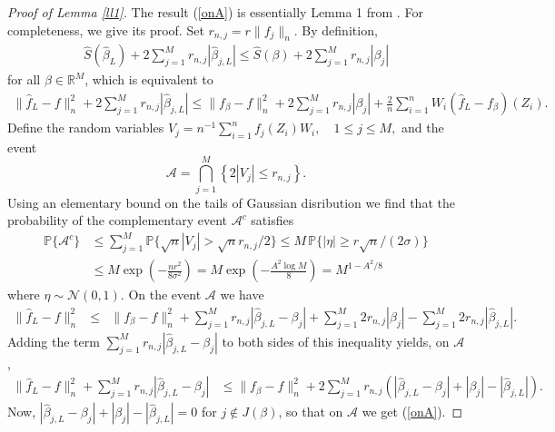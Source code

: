 \documentclass[dvips,aos]{imsart}
\numberwithin{equation}{section}
\theoremstyle{plain}
\def\sf{}
\def\wideth{\widehat}
\def\wh{\widehat}
\def\A{\mbox{$\mathcal A$}}
\def\RR{\mathbb R}
\def\PP{\mathbb{P}}
\begin{document}
\begin{proof}[Proof of Lemma \ref{ll1}] The result (\ref{onA}) is essentially Lemma 1
from \cite{btw06b}. For completeness, we give its proof. Set $
r_{n,j} = r \|f_j\|_n $. By definition,
\begin{eqnarray*}
\wh{S}(\widehat\beta_L) +  2\sum_{j=1}^M r_{n,j} |\widehat
\beta_{j,L}| \le \wh{S}(\beta) + 2\sum_{j=1}^M r_{n,j} |\beta_j|
\end{eqnarray*} for all $\beta\in\RR^M$,
which is equivalent to
\begin{eqnarray*}
\| \wideth{f}_L - f\|_n^2 +  2\sum_{j=1}^M r_{n,j} |\widehat
\beta_{j,L}| \le \| {\sf f}_{\beta} - f\|_n^2 +  2\sum_{j=1}^M
r_{n,j} |\beta_j| +\frac{2}{n}\sum_{i=1}^n W_i (\wideth{f}_L -
{\sf f}_{\beta})(Z_i) .
\end{eqnarray*}
Define the random variables $ V_j =  n^{-1} \sum_{i=1}^n f_j(Z_i)
W_i,\quad 1\le j\le M,$ and the event
\[ \A = \bigcap_{j=1}^M \left\{  2| V_j | \leq r_{n,j} \right\}.\]
Using an elementary bound on the tails of Gaussian disribution we
find that the probability of the complementary event $\A^c$
satisfies
\begin{equation}\label{tail}
\begin{split}
\PP \{ \A^c\}  &\le \sum_{j=1}^M  \PP\{ \sqrt{n}|V_j| >
\sqrt{n}r_{n,j}/2\} \le M \,\PP\{ |\eta|\ge r \sqrt{n}/(2\sigma)\}
\\
&\le M \exp\left( -\frac{n r^2}{ 8 \sigma^2} \right) = M \exp\left(
-\frac{A^2\log M}{ 8} \right) = M^{1-A^2/8}
\end{split}
 \end{equation}
where $\eta\sim{\mathcal N}(0,1)$. On the event $\A$ we have
\begin{eqnarray*}
\| \wideth f_L - f\|_n^2 & \le&  \| {\sf f}_{\beta} - f\|_n^2 +
\sum_{j=1}^M r_{n,j}|\widehat \beta_{j,L} - \beta_j| + \sum_{j=1}^M
2r_{n,j} |\beta_j| -  \sum_{j=1}^M 2r_{n,j} |\widehat\beta_{j,L}|.
\end{eqnarray*}
Adding the term $\sum_{j=1}^M r_{n,j}|\widehat \beta_{j,L} -
\beta_j|$ to both sides of this inequality yields, on $\A$,
\begin{eqnarray*}
\| \wideth f_L - f\|_n^2 + \sum_{j=1}^M r_{n,j}|\widehat \beta_{j,L}
- \beta_j|  &\le \| {\sf f}_{\beta} - f\|_n^2 + 2\sum_{j=1}^M
r_{n,j}\left(|\widehat \beta_{j,L} - \beta_j| + |\beta_j| -
|\widehat\beta_{j,L}|\right).
\end{eqnarray*}
Now, $|\widehat \beta_{j,L} - \beta_j| + |\beta_j| -
|\widehat\beta_{j,L}|=0$ for $j\not\in  J(\beta)$, so that on $\A$ we
get (\ref{onA}).


\end{proof}
\end{document}
